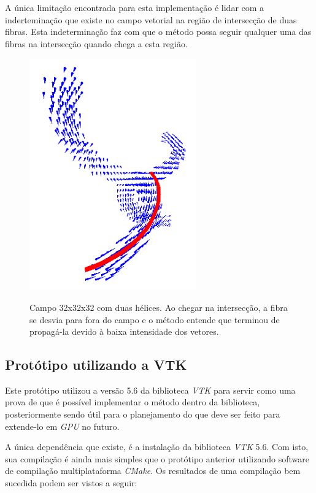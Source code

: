   A única limitação encontrada para esta implementação é lidar com a inderteminação que existe no campo vetorial na região de intersecção de duas fibras. Esta indeterminação faz com que o método possa seguir qualquer uma das fibras na intersecção quando chega a esta região.
  
  \begin{figure}[!h]
    \begin{center}
      \includegraphics[width=72mm, height=100mm]{images/fibraecampo.png}
      \label{fig:fibraecampo}
      \caption{Campo 32x32x32 com duas hélices. Ao chegar na intersecção, a fibra se desvia para fora do campo e o método entende que terminou de propagá-la devido à baixa intensidade dos vetores.}
    \end{center}
  \end{figure}
  
  \newpage
  \subsection{Protótipo utilizando a VTK}
  Este protótipo utilizou a versão 5.6 da biblioteca \textit{VTK} para servir como uma prova de que é possível implementar o método dentro da biblioteca, posteriormente sendo útil para o planejamento do que deve ser feito para extende-lo em \textit{GPU} no futuro.
  
  A única dependência que existe, é a instalação da biblioteca \textit{VTK} 5.6. Com isto, sua compilação é ainda mais simples que o protótipo anterior utilizando software de compilação multiplataforma \textit{CMake}. Os resultados de uma compilação bem sucedida podem ser vistos a seguir:
  
